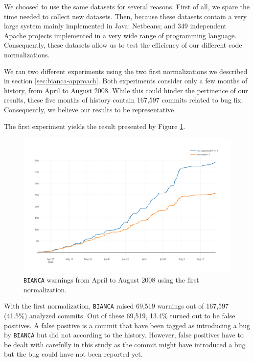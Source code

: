 We choosed to use the same datasets for several reasons. First of all, we spare the time needed to collect new datasets. Then, because these datasets contain a very large system mainly implemented in Java: Netbeans; and 349 independent Apache projects implemented in a very wide range of programming language. Consequently, these datasets allow us to test the efficiency of our different code normalizations.

We ran two different experiments using the two first normalizations we described in section \ref{sec:bianca-approach}. Both experiments consider only a few months of history, from April to August 2008. While this could hinder the pertinence of our results, these five months of history contain 167,597 commits related to bug fix. Consequently, we believe our results to be representative.

The first experiment yields the result presented by Figure \ref{fig:bianca-exp-1}.

\begin{figure}[h!]
  \centering
    \includegraphics[scale=0.55]{media/bianca-13.png}
    \caption{{\tt BIANCA} warnings from April to August 2008 using the first normalization.
    \label{fig:bianca-exp-1}}
\end{figure}

With the first normalization, {\tt BIANCA} raised 69,519 warnings out of 167,597 (41.5\%) analyzed commits.
Out of these 69,519, 13.4\% turned out to be false positives. A false positive is a commit that have been tagged as introducing a bug by {\tt BIANCA} but did not according to the history.
However, false positives have to be dealt with carefully in this study as the commit might have introduced a bug but the bug could have not been reported yet.

